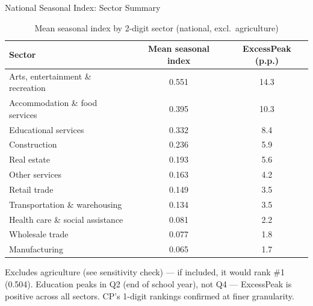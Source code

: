 \documentclass[aspectratio=169]{beamer}
\begin{document}
\begin{frame}{National Seasonal Index: Sector Summary}
  \begin{table}
    \centering
    \footnotesize
    \caption{Mean seasonal index by 2-digit sector (national, excl.\ agriculture)}
    \begin{tabular}{lcc}
      \toprule
      Sector & Mean seasonal index & ExcessPeak (p.p.) \\
      \midrule
      Arts, entertainment \& recreation   & 0.551 & 14.3 \\
      Accommodation \& food services      & 0.395 & 10.3 \\
      Educational services                & 0.332 & 8.4  \\
      Construction                        & 0.236 & 5.9  \\
      Real estate                         & 0.193 & 5.6  \\
      Other services                      & 0.163 & 4.2  \\
      Retail trade                        & 0.149 & 3.5  \\
      Transportation \& warehousing       & 0.134 & 3.5  \\
      \midrule
      Health care \& social assistance    & 0.081 & 2.2  \\
      Wholesale trade                     & 0.077 & 1.8  \\
      Manufacturing                       & 0.065 & 1.7  \\
      \bottomrule
    \end{tabular}
  \end{table}
  \vspace{0.3em}
  \small Excludes agriculture (see sensitivity check) --- if included, it
  would rank \#1 (0.504). Education peaks in Q2 (end of school year), not
  Q4 --- ExcessPeak is positive across all sectors. CP's 1-digit rankings
  confirmed at finer granularity.
\end{frame}
\end{document}
